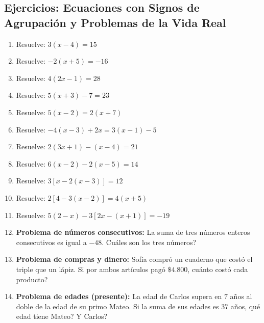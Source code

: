 \documentclass[12pt, letterpaper]{article}
\begin{document}
\subsection{Ejercicios: Ecuaciones con Signos de Agrupación y Problemas de la Vida Real}

\begin{enumerate}[leftmargin=*, start=61]
  \item \facil{} Resuelve: $3(x - 4) = 15$

  \item \facil{} Resuelve: $-2(x + 5) = -16$

  \item \facil{} Resuelve: $4(2x - 1) = 28$

  \item \facil{} Resuelve: $5(x + 3) - 7 = 23$

  \item \medio{} Resuelve: $5(x - 2) = 2(x + 7)$

  \item \medio{} Resuelve: $-4(x - 3) + 2x = 3(x - 1) - 5$

  \item \medio{} Resuelve: $2(3x + 1) - (x - 4) = 21$

  \item \medio{} Resuelve: $6(x - 2) - 2(x - 5) = 14$

  \item \medio{} Resuelve: $3[x - 2(x - 3)] = 12$

  \item \dificil{} Resuelve: $2[4 - 3(x - 2)] = 4(x + 5)$

  \item \dificil{} Resuelve: $5(2 - x) - 3[2x - (x + 1)] = -19$

  \item \medio{} \textbf{Problema de números consecutivos:} La suma de tres números enteros consecutivos es igual a $-48$. \textquestiondown Cuáles son los tres números?

  \item \medio{} \textbf{Problema de compras y dinero:} Sofía compró un cuaderno que costó el triple que un lápiz. Si por ambos artículos pagó $\$4.800$, \textquestiondown cuánto costó cada producto?

  \item \medio{} \textbf{Problema de edades (presente):} La edad de Carlos supera en $7$ años al doble de la edad de su primo Mateo. Si la suma de sus edades es $37$ años, \textquestiondown qué edad tiene Mateo? \textquestiondown Y Carlos?


\end{enumerate}
\end{document}
